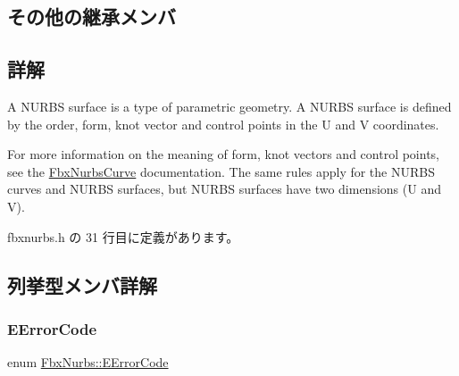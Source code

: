 \subsection*{その他の継承メンバ}


\subsection{詳解}
A N\+U\+R\+BS surface is a type of parametric geometry. A N\+U\+R\+BS surface is defined by the order, form, knot vector and control points in the U and V coordinates.

For more information on the meaning of form, knot vectors and control points, see the \hyperlink{class_fbx_nurbs_curve}{Fbx\+Nurbs\+Curve} documentation. The same rules apply for the N\+U\+R\+BS curves and N\+U\+R\+BS surfaces, but N\+U\+R\+BS surfaces have two dimensions (U and V). 

 fbxnurbs.\+h の 31 行目に定義があります。



\subsection{列挙型メンバ詳解}
\mbox{\label{class_fbx_nurbs_a1ff85864ee6533b4b6d43537ec625a66}} 
\subsubsection{\texorpdfstring{E\+Error\+Code}{EErrorCode}}
{\footnotesize\ttfamily enum \hyperlink{class_fbx_nurbs_a1ff85864ee6533b4b6d43537ec625a66}{Fbx\+Nurbs\+::\+E\+Error\+Code}}

